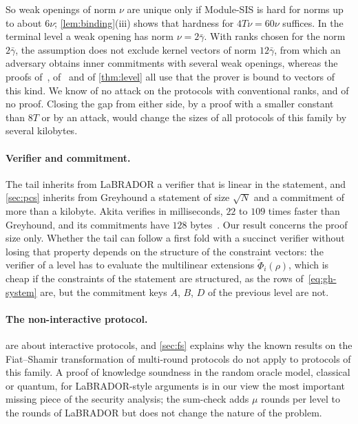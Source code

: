So weak openings of norm $\nu$ are unique only if Module-SIS is hard for norms up to about $6\nu$; \cref{lem:binding}(iii) shows that hardness for $4T\nu=60\nu$ suffices. In the terminal level a weak opening has norm $\nu=2\bar\gamma$. With ranks chosen for the norm $2\bar\gamma$, the assumption does not exclude kernel vectors of norm $12\bar\gamma$, from which an adversary obtains inner commitments with several weak openings, whereas the proofs of~\cite{BS23}, of~\cite{NS24} and of \cref{thm:level} all use that the prover is bound to vectors of this kind. We know of no attack on the protocols with conventional ranks, and of no proof. Closing the gap from either side, by a proof with a smaller constant than $8T$ or by an attack, would change the sizes of all protocols of this family by several kilobytes.

\paragraph{Verifier and commitment.}
The tail inherits from LaBRADOR a verifier that is linear in the statement, and \cref{sec:pcs} inherits from Greyhound a statement of size $\sqrt N$ and a commitment of more than a kilobyte. Akita verifies in milliseconds, $22$ to $109$ times faster than Greyhound, and its commitments have $128$ bytes~\cite{DBK26}. Our result concerns the proof size only. Whether the tail can follow a first fold with a succinct verifier without losing that property depends on the structure of the constraint vectors: the verifier of a level has to evaluate the multilinear extensions $\tilde\Phi_i(\rho)$, which is cheap if the constraints of the statement are structured, as the rows of~\eqref{eq:gh-system} are, but the commitment keys $A$, $B$, $D$ of the previous level are not.

\paragraph{The non-interactive protocol.}
 are about interactive protocols, and \cref{sec:fs} explains why the known results on the Fiat--Shamir transformation of multi-round protocols do not apply to protocols of this family. A proof of knowledge soundness in the random oracle model, classical or quantum, for LaBRADOR-style arguments is in our view the most important missing piece of the security analysis; the sum-check adds $\mu$ rounds per level to the rounds of LaBRADOR but does not change the nature of the problem.

